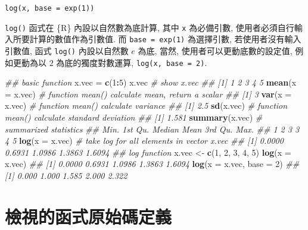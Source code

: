 \documentclass[
]{book}
\newenvironment{Shaded}{\begin{snugshade}}{\end{snugshade}}
\newcommand{\CommentTok}[1]{\textcolor[rgb]{0.56,0.35,0.01}{\textit{#1}}}
\newcommand{\DataTypeTok}[1]{\textcolor[rgb]{0.13,0.29,0.53}{#1}}
\newcommand{\DecValTok}[1]{\textcolor[rgb]{0.00,0.00,0.81}{#1}}
\newcommand{\KeywordTok}[1]{\textcolor[rgb]{0.13,0.29,0.53}{\textbf{#1}}}
\newcommand{\NormalTok}[1]{#1}
\newcommand{\OperatorTok}[1]{\textcolor[rgb]{0.81,0.36,0.00}{\textbf{#1}}}
\newcommand{\StringTok}[1]{\textcolor[rgb]{0.31,0.60,0.02}{#1}}
\begin{document}
\begin{verbatim}
log(x, base = exp(1))     
\end{verbatim}

\texttt{log()} 函式在 \{R\} 內設以自然數為底計算,
其中 \texttt{x} 為必備引數,
使用者必須自行輸入所要計算的數值作為引數值.
而 \texttt{base\ =\ exp(1)}
為選擇引數,
若使用者沒有輸入引數值,
函式 \texttt{log()} 內設以自然數 \(e\) 為底,
當然, 使用者可以更動底數的設定值,
例如更動為以 \(2\) 為底的獨度對數運算,
\texttt{log(x,\ base\ =\ 2)}.

\begin{Shaded}
\begin{Highlighting}[]
\CommentTok{\#\# basic function}
\NormalTok{x.vec =}\StringTok{ }\KeywordTok{c}\NormalTok{(}\DecValTok{1}\OperatorTok{:}\DecValTok{5}\NormalTok{)}
\NormalTok{x.vec           }\CommentTok{\# show x.vec}
\CommentTok{\#\# [1] 1 2 3 4 5}
\KeywordTok{mean}\NormalTok{(}\DataTypeTok{x =}\NormalTok{ x.vec) }\CommentTok{\# function mean() calculate mean, return a scalar}
\CommentTok{\#\# [1] 3}
\KeywordTok{var}\NormalTok{(}\DataTypeTok{x =}\NormalTok{ x.vec)  }\CommentTok{\# function mean() calculate variance}
\CommentTok{\#\# [1] 2.5}
\KeywordTok{sd}\NormalTok{(x.vec)       }\CommentTok{\# function mean() calculate standard deviation}
\CommentTok{\#\# [1] 1.581}
\KeywordTok{summary}\NormalTok{(x.vec)  }\CommentTok{\# summarized statistics}
\CommentTok{\#\#    Min. 1st Qu.  Median    Mean 3rd Qu.    Max. }
\CommentTok{\#\#       1       2       3       3       4       5}
\KeywordTok{log}\NormalTok{(}\DataTypeTok{x =}\NormalTok{ x.vec)  }\CommentTok{\# take log for all elements in vector x.vec}
\CommentTok{\#\# [1] 0.0000 0.6931 1.0986 1.3863 1.6094}
\CommentTok{\#\# log function}
\NormalTok{x.vec \textless{}{-}}\StringTok{ }\KeywordTok{c}\NormalTok{(}\DecValTok{1}\NormalTok{, }\DecValTok{2}\NormalTok{, }\DecValTok{3}\NormalTok{, }\DecValTok{4}\NormalTok{, }\DecValTok{5}\NormalTok{)}
\KeywordTok{log}\NormalTok{(}\DataTypeTok{x =}\NormalTok{ x.vec)}
\CommentTok{\#\# [1] 0.0000 0.6931 1.0986 1.3863 1.6094}
\KeywordTok{log}\NormalTok{(}\DataTypeTok{x =}\NormalTok{ x.vec, }\DataTypeTok{base =} \DecValTok{2}\NormalTok{)}
\CommentTok{\#\# [1] 0.000 1.000 1.585 2.000 2.322}
\end{Highlighting}
\end{Shaded}

\hypertarget{ux6aa2ux8996ux7684ux51fdux5f0fux539fux59cbux78bcux5b9aux7fa9}{%
\section{檢視的函式原始碼定義}\label{ux6aa2ux8996ux7684ux51fdux5f0fux539fux59cbux78bcux5b9aux7fa9}}
\end{document}
